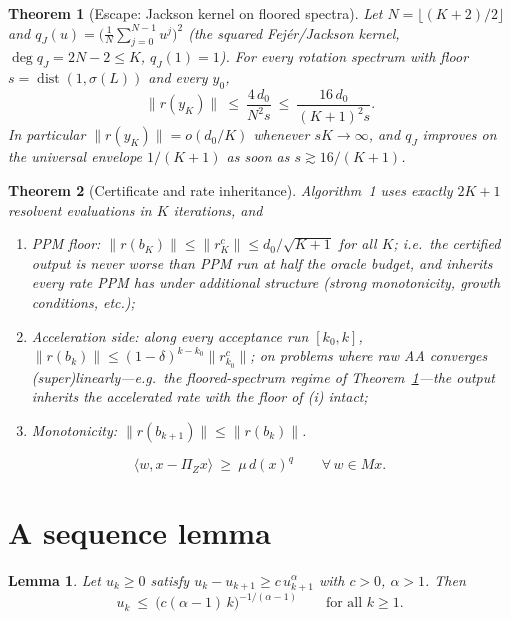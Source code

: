 \documentclass[10pt,a4paper]{amsart}
\newtheorem{theorem}{Theorem}
\newtheorem{lemma}{Lemma}
\DeclareMathOperator{\dist}{dist}
\newcommand{\inner}[2]{\langle #1, #2 \rangle}
\newcommand{\norm}[1]{\| #1 \|}
\begin{document}
\begin{theorem}[Escape: Jackson kernel on floored spectra]\label{thm:jackson}
Let $N=\lfloor(K+2)/2\rfloor$ and
$q_J(u)=\big(\frac1N\sum_{j=0}^{N-1}u^j\big)^2$ (the squared
Fej\'er/Jackson kernel, $\deg q_J=2N-2\le K$, $q_J(1)=1$). For every
rotation spectrum with floor $s=\dist(1,\sigma(L))$ and every $y_0$,
\begin{equation}\label{eq:jackson}
\norm{r(y_K)}\ \le\ \frac{4\,d_0}{N^2 s}
\ \le\ \frac{16\,d_0}{(K+1)^2 s}.
\end{equation}
In particular $\norm{r(y_K)}=o(d_0/K)$ whenever $sK\to\infty$, and
$q_J$ improves on the universal envelope $1/(K+1)$ as soon as
$s\gtrsim 16/(K+1)$.
\end{theorem}

\begin{theorem}[Certificate and rate inheritance]\label{thm:cert}
Algorithm~1 uses exactly $2K+1$ resolvent evaluations in $K$ iterations, and
\begin{enumerate}[label=(\roman*)]
\item \emph{PPM floor}: $\norm{r(b_K)}\le\norm{r^c_K}\le
      d_0/\sqrt{K+1}$ for all $K$; i.e.\ the certified output is never
      worse than PPM run at half the oracle budget, and inherits every
      rate PPM has under additional structure (strong monotonicity,
      growth conditions, etc.);
\item \emph{Acceleration side}: along every acceptance run
      $[k_0,k]$, $\norm{r(b_k)}\le(1-\delta)^{k-k_0}\norm{r^c_{k_0}}$;
      on problems where raw AA converges (super)linearly---e.g.\ the
      floored-spectrum regime of Theorem~\ref{thm:jackson}---the output
      inherits the accelerated rate with the floor of (i) intact;
\item \emph{Monotonicity}: $\norm{r(b_{k+1})}\le\norm{r(b_k)}$.
\end{enumerate}
\end{theorem}

\begin{equation}\label{eq:growth}
\inner{w}{x-\Pi_Zx}\ \ge\ \mu\, d(x)^q
\qquad\forall\, w\in Mx .
\end{equation}

\section{A sequence lemma}\label{app:seq}

\begin{lemma}\label{lem:seq}
Let $u_k\ge0$ satisfy $u_k-u_{k+1}\ge c\,u_{k+1}^{\alpha}$ with $c>0$,
$\alpha>1$. Then
\[
u_k\ \le\ \big(c(\alpha-1)\,k\big)^{-1/(\alpha-1)}
\qquad\text{for all }k\ge1 .
\]
\end{lemma}
\end{document}
